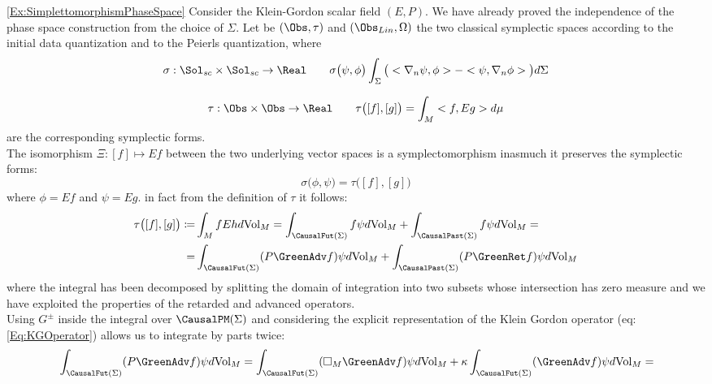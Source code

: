 \documentclass[Main]{subfiles}
\begin{document}
		\begin{example}\ref{Ex:SimplettomorphismPhaseSpace}
		Consider the Klein-Gordon scalar field $(E,P)$.
		We have already proved the independence of the phase space construction from the choice of $\Sigma$.
		Let be $(\Obs,\tau)$ and $(\Obs_{Lin},\Omega)$ the two classical symplectic spaces according to the initial data quantization and to the Peierls quantization, where
		\begin{displaymath}
			\sigma: \Sol_{sc}\times \Sol_{sc} \rightarrow \Real \qquad 
			\sigma\big( \psi, \phi \big) \int_\Sigma \big( <\nabla_n \psi ,\phi>  - <\psi, \nabla_n \phi> \big) d\Sigma
		\end{displaymath}
		
		\begin{displaymath}
			\tau: \Obs \times \Obs \rightarrow \Real \qquad
			\tau \big( [f] ,[g] \big) = \int_M < f, Eg> d\mu
		\end{displaymath}
		are the corresponding symplectic forms.\\
		The isomorphism $\Xi: [f] \mapsto E f$ between the two underlying vector spaces is a symplectomorphism 
		inasmuch it preserves the symplectic forms:
		\begin{displaymath}
			\sigma \big( \phi, \psi \big) =  \tau\big( [f], [g] \big)
		\end{displaymath}
		where $\phi = E f$ and $\psi= E g$.
		in fact from the definition of $\tau$ it follows:
		\begin{align}
		\tau\big( [f], [g] \big) \coloneqq  & \int_M f E h d\textrm{Vol}_M = 
		\int_{\CausalFut(\Sigma)} f \psi d\textrm{Vol}_M	 + \int_{\CausalPast(\Sigma)} f \psi d\textrm{Vol}_M =	\nonumber \\
		=& \int_{\CausalFut(\Sigma)} (P \GreenAdv f) \psi d\textrm{Vol}_M	 + \int_{\CausalPast(\Sigma)} ( P \GreenRet f ) \psi d\textrm{Vol}_M
		\end{align}
		where the integral has been decomposed by splitting the domain of integration into two subsets whose intersection has zero measure and we have exploited the properties of the retarded and advanced operators.\\
		Using $G^\pm$ inside the integral over $\CausalPM(\Sigma)$ and considering the explicit representation of the Klein Gordon operator (eq:\ref{Eq:KGOperator}) allows us to integrate by parts twice:
		\begin{align}
			&\int_{\CausalFut(\Sigma)} (P \GreenAdv f) \psi d\textrm{Vol}_M	=
			\int_{\CausalFut(\Sigma)} (\square_M \GreenAdv f) \psi d\textrm{Vol}_M	 + \kappa \int_{\CausalFut(\Sigma)} ( \GreenAdv f) \psi d\textrm{Vol}_M  = \nonumber\\

\end{align}
\end{example}
\end{document}
